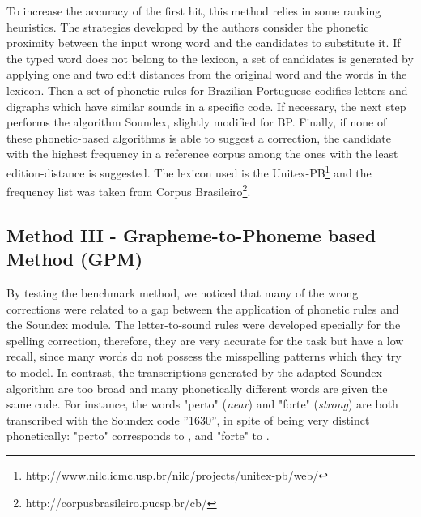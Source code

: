 To increase the accuracy of the first hit, this method relies in some ranking heuristics. The strategies developed by the authors consider the phonetic proximity between the input wrong word and the candidates to substitute it. If the typed word does not belong to the lexicon, a set of candidates is generated by applying one and two edit distances from the original word and the words in the lexicon. Then a set of phonetic rules for Brazilian Portuguese codifies letters and digraphs which have similar sounds in a specific code. If necessary, the next step performs the algorithm Soundex, slightly modified for BP. Finally, if none of these phonetic-based algorithms is able to suggest a correction, the candidate with the highest frequency in a reference corpus among the ones with the least edition-distance is suggested. The lexicon used is the Unitex-PB\footnote{http://www.nilc.icmc.usp.br/nilc/projects/unitex-pb/web/} and the frequency list was taken from Corpus Brasileiro\footnote{http://corpusbrasileiro.pucsp.br/cb/}.



\subsection{Method III - Grapheme-to-Phoneme based Method (GPM)}

By testing the benchmark method, we noticed that many of the wrong corrections were related to a gap between the application of phonetic rules and 
the Soundex module. The letter-to-sound rules were developed specially
for the spelling correction, therefore, they are very accurate for the task but have a low recall, since many words do not possess the misspelling patterns 
which they try to model. In contrast, the transcriptions generated by the adapted
Soundex algorithm are too broad and many phonetically different words are given the same code. For instance, the words "perto" (\emph{near}) and "forte" (\emph{strong}) are both
transcribed with the Soundex code ''1630'', in spite of being very distinct phonetically: 
"perto" corresponds to \textipa{['pEh.tU]}, and "forte" to .

